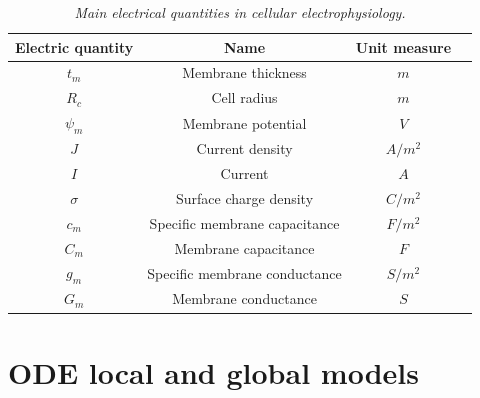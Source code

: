 \documentclass[12pt, a4paper]{report}
\begin{document}
\begin{table}[H]
	\begin{center}
		\begin{tabular}{ |c|c|c|c| } 
			\hline
			\textbf{Electric quantity} & \textbf{Name} & \textbf{Unit measure} \\
			\hline
			$t_m$ & Membrane thickness & $m$ \\ 
			\hline
			$R_c$ & Cell radius & $m$ \\
			\hline
			$\psi_m$ & Membrane potential & $V$ \\
			\hline
			$J$ & Current density & $A/m^2$ \\
			\hline
			$I$ & Current & $A$ \\
			\hline
			$\sigma$ & Surface charge density & $C/m^2$ \\
			\hline
			$c_m$ & Specific membrane capacitance & $F/m^2$ \\
			\hline
			$C_m$ & Membrane capacitance & $F$ \\
			\hline
			$g_m$ & Specific membrane conductance & $S/m^2$ \\
			\hline
			$G_m$ & Membrane conductance & $S$ \\
			
			\hline
		\end{tabular}
		
	\end{center}
	\caption{\textit{Main electrical quantities in cellular electrophysiology.}}
\end{table}


\section{ODE local and global models}
\end{document}
